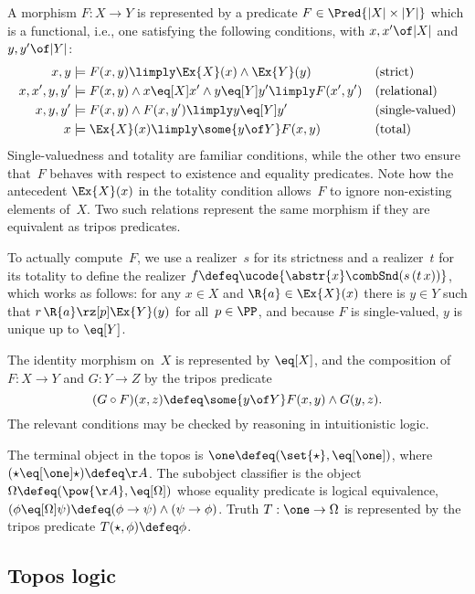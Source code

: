 A morphism $F : X \to Y$ is represented by a predicate $F \in \Pred{|X| \times |Y|}$ which is a functional, i.e., one satisfying the following conditions, with $x, x' \of |X|$ and $y, y' \of |Y|$:
%
\begin{align*}
  x, y &\models F(x,y) \limply \Ex{X}(x) \land \Ex{Y}(y)
     & &\text{(strict)} \\
  x, x', y, y' &\models F(x,y) \land x \eq[X] x' \land y \eq[Y] y' \limply F(x', y')
     & &\text{(relational)} \\
  x, y, y' &\models F(x, y) \land F(x, y') \limply y \eq[Y] y'
     & &\text{(single-valued)} \\
  x &\models \Ex{X}(x) \limply \some{y \of Y} F(x, y)
     & &\text{(total)}
\end{align*}
%
Single-valuedness and totality are familiar conditions, while the other two ensure that~$F$
behaves with respect to existence and equality predicates. Note how the antecedent $\Ex{X}(x)$ in the totality condition allows~$F$ to ignore non-existing elements of~$X$.
%
Two such relations represent the same morphism if they are equivalent as tripos predicates.

To actually compute~$F$, we use a realizer~$s$ for its strictness and a realizer~$t$ for its totality to define the realizer $f \defeq \ucode{\abstr{x} \combSnd (s \, (t \, x))}$, which works as follows: for any $x \in X$ and $\R{a} \in \Ex{X}(x)$ there is $y \in Y$ such that $r \, \R{a} \rz[p] \Ex{Y}(y)$ for all~$p \in \PP$,
and because $F$ is single-valued, $y$ is unique up to $\eq[Y]$.

The identity morphism on~$X$ is represented by $\eq[X]$,
and the composition of $F : X \to Y$ and $G : Y \to Z$ by the tripos predicate
%
\begin{equation*}
  (G \circ F)(x, z) \defeq \some{y \of Y} F(x, y) \land G(y, z).
\end{equation*}
%
The relevant conditions may be checked by reasoning in intuitionistic logic.

The terminal object in the topos is $\one \defeq (\set{\star}, {\eq[\one]})$, where $(\star \eq[\one] \star) \defeq \AA$.
%
The subobject classifier is the object $\Omega \defeq (\pow{\AA}, \eq[\Omega])$ whose equality predicate is logical equivalence,
%
$
  (\phi \eq[\Omega] \psi) \defeq
  (\phi \to \psi) \land (\psi \to \phi)
$.
%
Truth $T : \one \to \Omega$ is represented by the tripos predicate $T(\star, \phi) \defeq \phi$.


\subsection{Topos logic}
\label{sec:internal-logic-topos}

